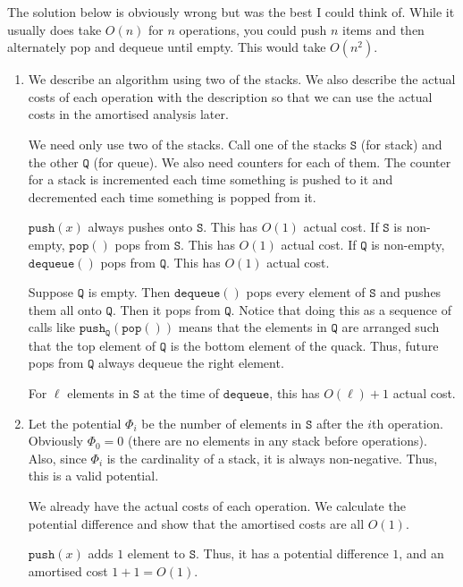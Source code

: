 \documentclass[12 pt, letterpaper]{hmcpset}
\begin{document}
\begin{solution}
	The solution below is obviously wrong but was the best I could think of. While it usually does take $O(n)$ for $n$ operations, you could push $n$ items and then alternately pop and dequeue until empty. This would take $O(n^{2})$.
	\begin{enumerate}
		\item We describe an algorithm using two of the stacks. We also describe the actual costs of each operation with the description so that we can use the actual costs in the amortised analysis later.

			We need only use two of the stacks. Call one of the stacks $\mathtt{S}$ (for stack) and the other $\mathtt{Q}$ (for queue). We also need counters for each of them. The counter for a stack is incremented each time something is pushed to it and decremented each time something is popped from it. 

			$\mathtt{push}(x)$ always pushes onto $\mathtt{S}$. This has $O(1)$ actual cost. 
			If $\mathtt{S}$ is non-empty, $\mathtt{pop}()$ pops from $\mathtt{S}$.
			This has $O(1)$ actual cost.
			If $\mathtt{Q}$ is non-empty, $\mathtt{dequeue}()$ pops from $\mathtt{Q}$.
			This has $O(1)$ actual cost.

			Suppose $\mathtt{Q}$ is empty. 
			Then $\mathtt{dequeue}()$ pops every element of $\mathtt{S}$ 
			and pushes them all onto $\mathtt{Q}$. 
			Then it pops from $\mathtt{Q}$.
			Notice that doing this as a sequence of calls 
			like $\mathtt{push_{Q}}(\mathtt{pop}())$ 
			means that the elements in $\mathtt{Q}$ are arranged 
			such that the top element of $\mathtt{Q}$ is the bottom element of the quack.
			Thus, future pops from $\mathtt{Q}$ always dequeue the right element.

			For $\ell$ elements in $\mathtt{S}$ at the time of $\mathtt{dequeue}$,
			this has $O(\ell) + 1$ actual cost.

		\item Let the potential $\Phi_{i}$ be the number of elements in $\mathtt{S}$ after the $i$th operation. Obviously $\Phi_{0} = 0$ (there are no elements in any stack before operations). Also, since $\Phi_{i}$ is the cardinality of a stack, it is always non-negative. Thus, this is a valid potential.

			We already have the actual costs of each operation. We calculate the potential difference and show that the amortised costs are all $O(1)$.

			$\mathtt{push}(x)$ adds $1$ element to $\mathtt{S}$. Thus, it has a potential difference $1$, and an amortised cost $1 + 1 = O(1)$.


\end{enumerate}
\end{solution}
\end{document}
